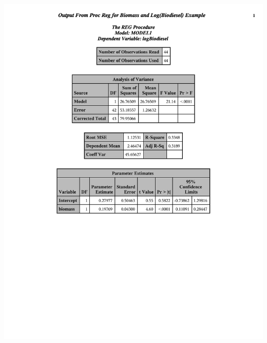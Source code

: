 \begin{center}
\includegraphics[scale=0.4,page=3,trim= 10mm 100mm 10mm 10mm]{slrbiodiesel}
\end{center}

